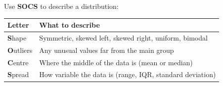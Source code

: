 \documentclass[
  11pt,
  a4paper,
  oneside,
  open=any]{scrbook}
\begin{document}
Use \textbf{SOCS} to describe a distribution:

\begin{longtable}[]{@{}
  >{\raggedright\arraybackslash}p{}
  >{\raggedright\arraybackslash}p{}@{}}
\toprule\noalign{}
\begin{minipage}[b]{\linewidth}\raggedright
Letter
\end{minipage} & \begin{minipage}[b]{\linewidth}\raggedright
What to describe
\end{minipage} \\
\midrule\noalign{}
\endhead
\bottomrule\noalign{}
\endlastfoot
\textbf{S}hape & Symmetric, skewed left, skewed right, uniform,
bimodal \\
\textbf{O}utliers & Any unusual values far from the main group \\
\textbf{C}entre & Where the middle of the data is (mean or median) \\
\textbf{S}pread & How variable the data is (range, IQR, standard
deviation) \\
\end{longtable}
\end{document}
